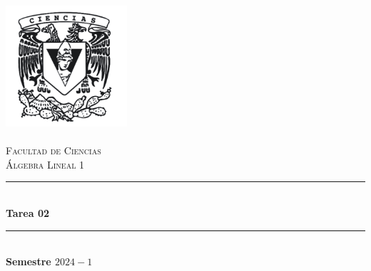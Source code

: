\begin{titlepage}
\center %
\newcommand{\HRule}{\rule{\linewidth}{0.5mm}} 

\includegraphics[width=4.5cm]{IMA/Ciencias.png} \\ 
\quad \\[1.5cm]
\textsc{\Large Facultad de Ciencias}\\[0.5cm] %
\textsc{\Large Álgebra Lineal 1}\\[0.5cm] %
\makeatletter
    \HRule \\ [0.4cm]
        { \huge \bfseries Tarea 02}\\
    \HRule \\ [0.4cm]
\large\textbf{Semestre $2024-1$}\\


\end{titlepage}
